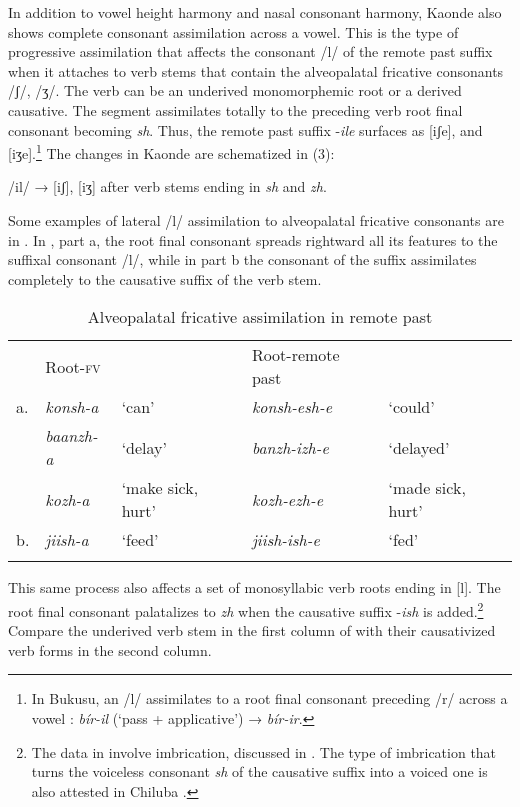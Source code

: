 \documentclass[output=paper]{langsci/langscibook}
\begin{document}
In addition to vowel height harmony and nasal consonant harmony, Kaonde also shows complete consonant assimilation across a vowel. This is the type of progressive assimilation that affects the consonant /l/ of the remote past suffix when it attaches to verb stems that contain the alveopalatal fricative consonants /ʃ/, /ʒ/. The verb can be an underived monomorphemic root or a derived causative. The segment assimilates totally to the preceding verb root final consonant becoming \textit{sh}. Thus, the remote past suffix -\textit{ile} surfaces as [iʃe], and [iʒe].\footnote{In Bukusu, an /l/ assimilates to a root final consonant preceding /r/ across a vowel \citep{hyman2003}: \textit{bír-il} (‘pass + applicative’) → \textit{bír-ir}.} The changes in Kaonde are schematized in (3):

\ea
\label{ex:3.kawasha}
/il/ → [iʃ], [iʒ] after verb stems ending in \textit{sh} and \textit{zh}.
\z

Some examples of lateral /l/ assimilation to alveopalatal fricative consonants are in . In , part a, the root final consonant spreads rightward all its features to the suffixal consonant /l/, while in part b the consonant of the suffix assimilates completely to the causative suffix of the verb stem. 

\begin{table}
\begin{tabular}{lllll}
\lsptoprule
 & Root-\textsc{fv} &  & Root-remote past & \\
a. & \textit{konsh-a} & `can' & \textit{konsh-esh-e} & `could' \\
 & \textit{baanzh-a} & `delay' & \textit{banzh-izh-e} & `delayed' \\
 & \textit{kozh-a} & `make sick, hurt' & \textit{kozh-ezh-e} & `made sick, hurt' \\
b. & \textit{jiish-a} & `feed' & \textit{jiish-ish-e} & `fed' \\

\lspbottomrule
\end{tabular}

\caption{Alveopalatal fricative assimilation in remote past}
\label{tab:5.kawasha}

\end{table}


This same process also affects a set of monosyllabic verb roots ending in [l]. The root final consonant palatalizes to \textit{zh} when the causative suffix -\textit{ish} is added.\footnote{The data in  involve imbrication, discussed in . The type of imbrication that turns the voiceless consonant \textit{sh} of the causative suffix into a voiced one is also attested in Chiluba \citep[73]{lukusa1993}.} Compare the underived verb stem in the first column of  with their causativized verb forms in the second column.
\end{document}
